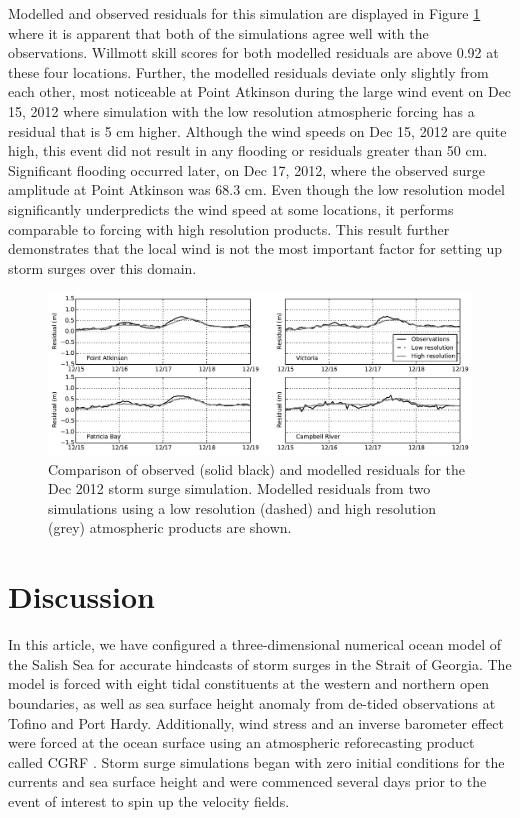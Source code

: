 \documentclass[pdftex,10pt]{article}
\begin{document}
Modelled and observed residuals for this simulation are displayed in Figure \ref{fig:dec2012_surge} where it is apparent that both of the simulations agree well with the observations. Willmott skill scores for both modelled residuals are above 0.92 at these four locations. Further, the modelled residuals deviate only slightly from each other, most noticeable at Point Atkinson during the large wind event on Dec 15, 2012 where simulation with the low resolution atmospheric forcing has a residual that is 5 cm higher. Although the wind speeds on Dec 15, 2012 are quite high, this event did not result in any flooding or residuals greater than 50 cm. Significant flooding occurred later, on Dec 17, 2012, where the observed surge amplitude at Point Atkinson was 68.3 cm. Even though the low resolution model significantly underpredicts the wind speed at some locations, it performs comparable to forcing with high resolution products. This result further demonstrates that the local wind is not the most important factor for setting up storm surges over this domain.

\begin{figure}
\centering
\includegraphics[scale=0.6]{Figures/dec2012_surge.pdf}
\caption{Comparison of observed (solid black) and modelled residuals for the Dec 2012 storm surge simulation. Modelled residuals from two simulations using a low resolution (dashed) and high resolution (grey) atmospheric products are shown. }
\label{fig:dec2012_surge}
\end{figure}

\section{Discussion}\label{sec:diss}
In this article, we have configured a three-dimensional numerical ocean model of the Salish Sea for accurate hindcasts of storm surges in the Strait of Georgia. The model is forced with eight tidal constituents at the western and northern open boundaries, as well as sea surface height anomaly from de-tided observations at Tofino and Port Hardy. Additionally, wind stress and an inverse barometer effect were forced at the ocean surface using an atmospheric reforecasting product called CGRF \citep{smith2014new}. Storm surge simulations began with zero initial conditions for the currents and sea surface height and were commenced several days prior to the event of interest to spin up the velocity fields. 
\end{document}
